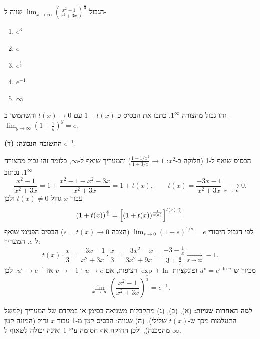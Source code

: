 
\begin{question}
הגבול $\displaystyle\lim_{x\to\infty}\left(\frac{x^2-1}{x^2+3x}\right)^{\frac{x}{3}}$ שווה ל-
\begin{enumerate}
  \item $e^3$
  \item $e$
  \item $e^{\frac13}$
  \item $e^{-1}$
  \item $\infty$
\end{enumerate}
\end{question}

\begin{hint}
זהו גבול מהצורה $1^\infty$. כתבו את הבסיס כ-$1+t(x)$ עם $t(x)\to 0$ והשתמשו ב-$\lim_{y\to\infty}\left(1+\frac1y\right)^y=e$.
\end{hint}

\begin{solution}
\textbf{התשובה הנכונה: (ד)} $e^{-1}$.

הבסיס שואף ל-1 (חלוקה ב-$x^2$: $\frac{1-1/x^2}{1+3/x}\to 1$) והמעריך שואף ל-$\infty$, כלומר זהו גבול מהצורה $1^\infty$. נכתוב
\[
\frac{x^2-1}{x^2+3x}=1+\frac{x^2-1-x^2-3x}{x^2+3x}=1+t(x),\qquad t(x)=\frac{-3x-1}{x^2+3x}\xrightarrow[x\to\infty]{}0 .
\]
עבור $x$ גדול $t(x)\neq 0$ ולכן
\[
\left(1+t(x)\right)^{\frac x3}=\Bigl[\left(1+t(x)\right)^{\frac{1}{t(x)}}\Bigr]^{t(x)\cdot\frac{x}{3}} .
\]
לפי הגבול היסודי $\lim_{s\to 0}(1+s)^{1/s}=e$ (הצבה $s=t(x)\to 0$) הבסיס הפנימי שואף ל-$e$. המעריך:
\[
t(x)\cdot\frac x3=\frac{-3x-1}{x^2+3x}\cdot\frac{x}{3}=\frac{-3x^2-x}{3x^2+9x}=\frac{-3-\frac1x}{3+\frac9x}\xrightarrow[x\to\infty]{}-1 .
\]
מכיוון ש-$u^v=e^{v\ln u}$ ופונקציות $\ln$ ו-$\exp$ רציפות, אם $u\to e$ ו-$v\to -1$ אז $u^v\to e^{-1}$. לכן
\[
\lim_{x\to\infty}\left(\frac{x^2-1}{x^2+3x}\right)^{\frac{x}{3}}=\boxed{e^{-1}} .
\]

\textbf{למה האחרות שגויות:} (א), (ב), (ג) מתקבלות משגיאה בסימן או במקדם של המעריך (למשל התעלמות מכך ש-$t(x)$ שלילי). (ה) שגויה: הבסיס קטן מ-1 עבור $x$ גדול (המונה קטן מהמכנה), ולכן החזקה אף חסומה ע"י 1 ואינה יכולה לשאוף ל-$\infty$.
\end{solution}
